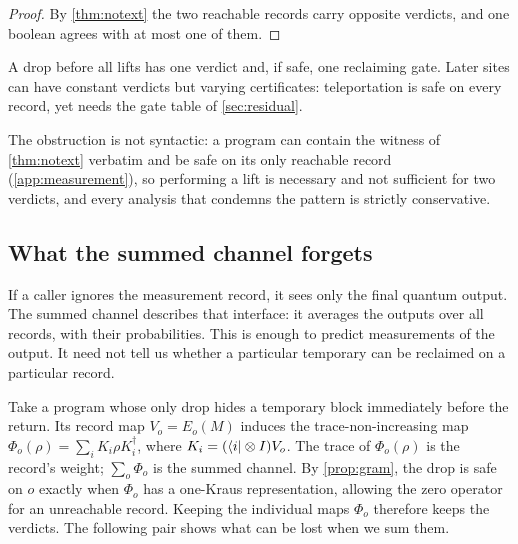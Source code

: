 \documentclass[acmsmall,screen,review,anonymous,nonacm]{acmart}
\begin{document}
\begin{proof}
By \cref{thm:notext} the two reachable records carry opposite verdicts, and
one boolean agrees with at most one of them.
\end{proof}

A drop before all lifts has one verdict and, if safe, one reclaiming
gate. Later sites can have constant verdicts but varying certificates:
teleportation is safe on every record, yet needs the gate table of
\cref{sec:residual}.

The obstruction is not syntactic: a program can contain the witness of
\cref{thm:notext} verbatim and be safe on its only reachable record
(\cref{app:measurement}), so performing a lift is necessary and not
sufficient for two verdicts, and every analysis that condemns the pattern is
strictly conservative.

\subsection{What the summed channel forgets}\label{sec:channel}

If a caller ignores the measurement record, it sees only the final quantum
output. The summed channel describes that interface: it averages the
outputs over all records, with their probabilities. This is enough to
predict measurements of the output. It need not tell us whether a
particular temporary can be reclaimed on a particular record.

Take a program whose only drop hides a temporary block immediately
before the return. Its record map
$V_o=E_o(M)$ induces the trace-non-increasing map
$\Phi_o(\rho)=\sum_iK_i\rho K_i^\dagger$, where
$K_i=(\langle i \rvert\otimes I)V_o$. The trace of $\Phi_o(\rho)$ is the
record's weight; $\sum_o\Phi_o$ is the summed channel. By
\cref{prop:gram}, the drop is safe on $o$ exactly when $\Phi_o$ has a
one-Kraus representation, allowing the zero operator for an unreachable record.
Keeping the individual maps $\Phi_o$ therefore keeps the verdicts.
The following pair shows what can be lost when we sum them.
\end{document}
